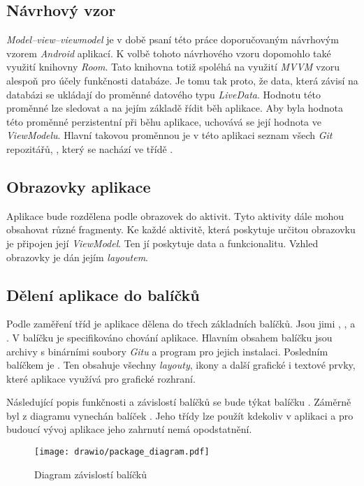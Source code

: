     \subsection{Návrhový vzor}
    \emph{Model–view–viewmodel} je v době psaní této práce doporučovaným návrhovým vzorem \emph{Android} aplikací. K volbě tohoto návrhového vzoru dopomohlo také využití knihovny \emph{Room}. Tato knihovna totiž spoléhá na využití \emph{MVVM} vzoru alespoň pro účely funkčnosti databáze. Je tomu tak proto, že data, která závisí na databázi se ukládají do proměnné datového typu \emph{LiveData}. Hodnotu této proměnné lze sledovat a na jejím základě řídit běh aplikace. Aby byla hodnota této proměnné perzistentní při běhu aplikace, uchovává se její hodnota ve \emph{ViewModelu}. Hlavní takovou proměnnou je v této aplikaci seznam všech \emph{Git} repozitářů, , který se nachází ve třídě .
    
    \subsection{Obrazovky aplikace}
    Aplikace bude rozdělena podle obrazovek do aktivit. Tyto aktivity dále mohou obsahovat různé fragmenty. Ke každé aktivitě, která poskytuje určitou obrazovku je připojen její \emph{ViewModel}. Ten jí poskytuje data a funkcionalitu. Vzhled obrazovky je dán jejím \emph{layoutem}.

    \newpage
    \subsection{Dělení aplikace do balíčků}
    Podle zaměření tříd je aplikace dělena do třech základních balíčků. Jsou jimi , , a . V balíčku  je specifikováno chování aplikace. Hlavním obsahem balíčku  jsou archivy s binárními soubory \emph{Gitu} a program  pro jejich instalaci. Posledním balíčkem je . Ten obsahuje všechny \emph{layouty}, ikony a další grafické i textové prvky, které aplikace využívá pro grafické rozhraní.

    Následující popis funkčnosti a závislostí balíčků se bude týkat balíčku . Záměrně byl z diagramu vynechán balíček . Jeho třídy lze použít kdekoliv v aplikaci a pro budoucí vývoj aplikace jeho zahrnutí nemá opodstatnění.

    \begin{figure}[h]
        \centering
        \vspace{0.5cm}
        \texttt{[image: drawio/package\_diagram.pdf]}
        \caption[Diagram závislostí balíčků]{Diagram závislostí balíčků}
        \label{diagram:packages}
    \end{figure}

